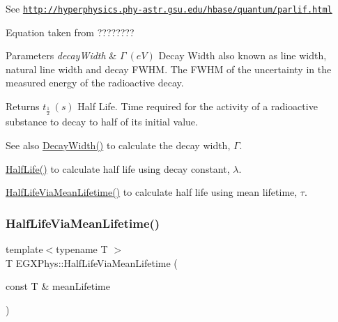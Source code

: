 See \href{http://hyperphysics.phy-astr.gsu.edu/hbase/quantum/parlif.html}{\tt http\+://hyperphysics.\+phy-\/astr.\+gsu.\+edu/hbase/quantum/parlif.\+html}

Equation taken from ????????


\begin{DoxyParams}{Parameters}
{\em decay\+Width} & $\Gamma\ (eV)$ Decay Width also known as line width, natural line width and decay F\+W\+HM. The F\+W\+HM of the uncertainty in the measured energy of the radioactive decay. \\
\hline
\end{DoxyParams}
\begin{DoxyReturn}{Returns}
$t_{\frac{1}{2}}\ (s)$ Half Life. Time required for the activity of a radioactive substance to decay to half of its initial value. 
\end{DoxyReturn}
\begin{DoxySeeAlso}{See also}
\mbox{\hyperlink{group___e_g_x_phys-_decay_width_gae232ec8bb39710131be898c057a25620}{Decay\+Width()}} to calculate the decay width, $\Gamma$. 

\mbox{\hyperlink{group___e_g_x_phys-_half_life_ga21d268f154fb91c1c556bbfa7fe83ac1}{Half\+Life()}} to calculate half life using decay constant, $\lambda$. 

\mbox{\hyperlink{group___e_g_x_phys-_half_life_gacddef16b62e98b214ec8dd8af7da7dce}{Half\+Life\+Via\+Mean\+Lifetime()}} to calculate half life using mean lifetime, $\tau$. 
\end{DoxySeeAlso}
\mbox{\label{group___e_g_x_phys-_half_life_gacddef16b62e98b214ec8dd8af7da7dce}} 
\subsubsection{\texorpdfstring{Half\+Life\+Via\+Mean\+Lifetime()}{HalfLifeViaMeanLifetime()}}
{\footnotesize\ttfamily template$<$typename T $>$ \\
T E\+G\+X\+Phys\+::\+Half\+Life\+Via\+Mean\+Lifetime (\begin{DoxyParamCaption}\item[{const T \&}]{mean\+Lifetime }\end{DoxyParamCaption})}



